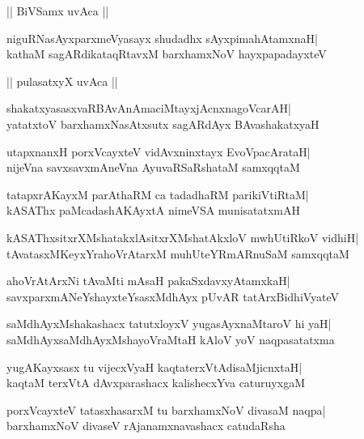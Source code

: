 \documentclass[twoside,12pt,openright]{book}
\newcounter{shloka}[chapter]
\begin{document}
\begin{center}
|| BiVSamx uvAca ||
\end{center}
\begin{shloka}%
niguRNasAyxparxmeVyasayx shudadhx sAyxpimahAtamxnaH|\\
kathaM sagARdikataqRtavxM barxhamxNoV hayxpapadayxteV
\end{shloka}

|| pulasatxyX uvAca ||
\begin{shloka}%
shakatxyasasxvaRBAvAnAmaciMtayxjAcnxnagoVcarAH|\\
yatatxtoV barxhamxNasAtxsutx sagARdAyx BAvashakatxyaH
\end{shloka}

\begin{shloka}%
utapxnanxH porxVcayxteV vidAvxninxtayx EvoVpacArataH|\\
nijeVna savxsavxmAneVna AyuvaRSaRshataM samxqqtaM
\end{shloka}

\begin{shloka}%
tatapxrAKayxM parAthaRM ca tadadhaRM parikiVtiRtaM|\\
kASAThx paMcadashAKAyxtA nimeVSA munisatatxmAH
\end{shloka}

\begin{shloka}%
kASAThxsitxrXMshatakxlAsitxrXMshatAkxloV mwhUtiRkoV vidhiH|\\
tAvatasxMKeyxYrahoVrAtarxM muhUteYRmARnuSaM samxqqtaM
\end{shloka}

\begin{shloka}%
ahoVrAtArxNi tAvaMti mAsaH pakaSxdavxyAtamxkaH|\\
savxparxmANeYshayxteYsasxMdhAyx pUvAR tatArxBidhiVyateV
\end{shloka}

\begin{shloka}%
saMdhAyxMshakashacx tatutxloyxV yugasAyxnaMtaroV hi yaH|\\
saMdhAyxsaMdhAyxMshayoVraMtaH kAloV yoV naqpasatatxma
\end{shloka}

\begin{shloka}%
yugAKayxsasx tu vijecxVyaH kaqtaterxVtAdisaMjicnxtaH|\\
kaqtaM terxVtA dAvxparashacx kalishecxYva caturuyxgaM
\end{shloka}

\begin{shloka}%
porxVcayxteV tatasxhasarxM tu barxhamxNoV divasaM naqpa|\\
barxhamxNoV divaseV rAjanamxnavashacx catudaRsha
\end{shloka}
\end{document}
